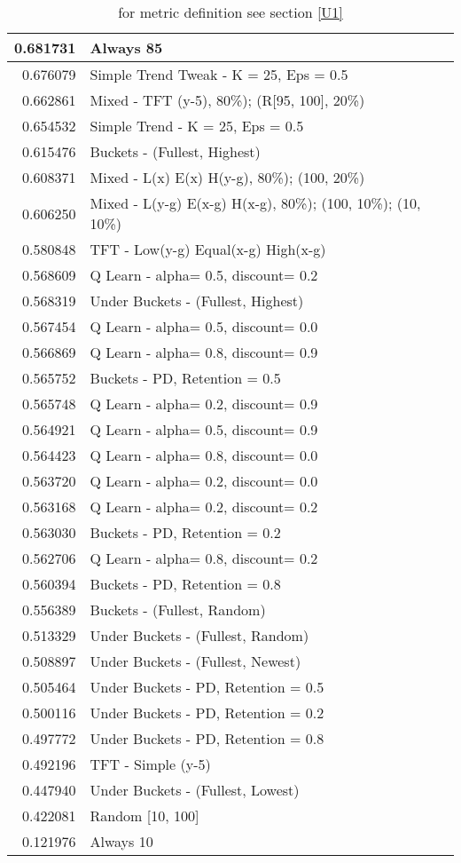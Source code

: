 \begin{table}[!hbtp]
\begin{footnotesize}
\begin{tabular}{|r|l|}
0.681731 & Always 85\\ \hline
0.676079 & Simple Trend Tweak - K = 25, Eps = 0.5\\ \hline
0.662861 & Mixed - {TFT (y-5), 80\%); (R[95, 100], 20\%)}\\ \hline
0.654532 & Simple Trend - K = 25, Eps = 0.5\\ \hline
0.615476 & Buckets - (Fullest, Highest)\\ \hline
0.608371 & Mixed - {L(x) E(x) H(y-g), 80\%); (100, 20\%)}\\ \hline
0.606250 & Mixed - {L(y-g) E(x-g) H(x-g), 80\%); (100, 10\%); (10, 10\%)}\\ \hline
0.580848 & TFT - Low(y-g) Equal(x-g) High(x-g)\\ \hline
0.568609 & Q Learn - alpha= 0.5, discount= 0.2\\ \hline
0.568319 & Under Buckets - (Fullest, Highest)\\ \hline
0.567454 & Q Learn - alpha= 0.5, discount= 0.0\\ \hline
0.566869 & Q Learn - alpha= 0.8, discount= 0.9\\ \hline
0.565752 & Buckets - PD, Retention = 0.5\\ \hline
0.565748 & Q Learn - alpha= 0.2, discount= 0.9\\ \hline
0.564921 & Q Learn - alpha= 0.5, discount= 0.9\\ \hline
0.564423 & Q Learn - alpha= 0.8, discount= 0.0\\ \hline
0.563720 & Q Learn - alpha= 0.2, discount= 0.0\\ \hline
0.563168 & Q Learn - alpha= 0.2, discount= 0.2\\ \hline
0.563030 & Buckets - PD, Retention = 0.2\\ \hline
0.562706 & Q Learn - alpha= 0.8, discount= 0.2\\ \hline
0.560394 & Buckets - PD, Retention = 0.8\\ \hline
0.556389 & Buckets - (Fullest, Random)\\ \hline
0.513329 & Under Buckets - (Fullest, Random)\\ \hline
0.508897 & Under Buckets - (Fullest, Newest)\\ \hline
0.505464 & Under Buckets - PD, Retention = 0.5\\ \hline
0.500116 & Under Buckets - PD, Retention = 0.2\\ \hline
0.497772 & Under Buckets - PD, Retention = 0.8\\ \hline
0.492196 & TFT - Simple (y-5)\\ \hline
0.447940 & Under Buckets - (Fullest, Lowest)\\ \hline
0.422081 & Random [10, 100]\\ \hline
0.121976 & Always 10\\ \hline
\end{tabular}
\caption{for metric definition see section \eqref{U1}}
\end{footnotesize}
\end{table}

